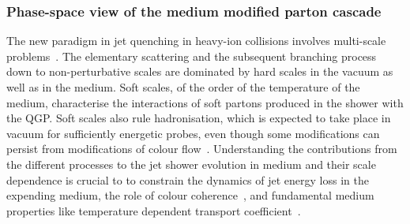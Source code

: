 \subsubsection*{Phase-space view of the medium modified parton cascade}
The new paradigm in jet quenching in heavy-ion collisions involves multi-scale problems~\cite{Kurkela:2014tla,Tachibana:2018yae}. The elementary scattering and the subsequent branching process down to non-perturbative scales are dominated by hard scales in the vacuum as well as in the medium. Soft scales, of the order of the temperature of the medium, characterise the interactions of soft partons produced in the shower with the QGP. Soft scales also rule hadronisation, which is expected to take place in vacuum for sufficiently energetic probes, even though some modifications can persist from modifications of colour flow~\cite{Aurenche:2011rd,Beraudo:2011bh,Beraudo:2012bq}. Understanding the contributions from the different processes to the jet shower evolution in medium and their scale dependence is crucial to to constrain the dynamics of jet energy loss in the expending medium, the role of colour coherence~\cite{CasalderreySolana:2012ef}, and fundamental medium properties like temperature dependent transport coefficient~\cite{DEramo:2012uzl,Ayala:2016pvm}.

